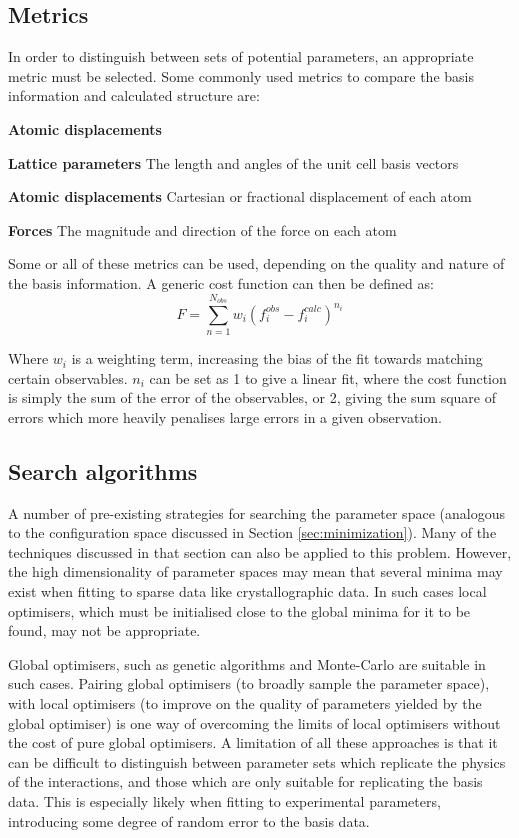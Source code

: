 \subsection{Metrics}
In order to distinguish between sets of potential parameters, an appropriate metric must be selected.
Some commonly used metrics to compare the basis information and calculated structure are:
\begin{labeling}{\textbf{Atomic displacements}}
	\item [\textbf{Lattice parameters}] The length and angles of the unit cell basis vectors
	\item [\textbf{Atomic displacements}] Cartesian or fractional displacement of each atom
	\item [\textbf{Forces}] The magnitude and direction of the force on each atom
\end{labeling}
Some or all of these metrics can be used, depending on the quality and nature of the basis information.
A generic cost function can then be defined as:
\begin{equation}
	F = \sum_{n=1}^{N_{obs}}w_i(f_i^{obs} - f_i^{calc})^{n_i}
\end{equation}

Where $w_i$ is a weighting term, increasing the bias of the fit towards matching certain observables.
$n_i$ can be set as 1 to give a linear fit, where the cost function is simply the sum of the error of the observables, or 2, giving the sum square of errors which more heavily penalises large errors in a given observation.

\subsection{Search algorithms}
A number of pre-existing strategies for searching the parameter space (analogous to the configuration space discussed in Section \ref{sec:minimization}).
Many of the techniques discussed in that section can also be applied to this problem.
However, the high dimensionality of parameter spaces may mean that several minima may exist when fitting to sparse data like crystallographic data.
In such cases local optimisers, which must be initialised close to the global minima for it to be found, may not be appropriate.

Global optimisers, such as genetic algorithms and Monte-Carlo are suitable in such cases.
Pairing global optimisers (to broadly sample the parameter space), with local optimisers (to improve on the quality of parameters yielded by the global optimiser) is one way of overcoming the limits of local optimisers without the cost of pure global optimisers.
A limitation of all these approaches is that it can be difficult to distinguish between parameter sets which replicate the physics of the interactions, and those which are only suitable for replicating the basis data.
This is especially likely when fitting to experimental parameters, introducing some degree of random error to the basis data.

